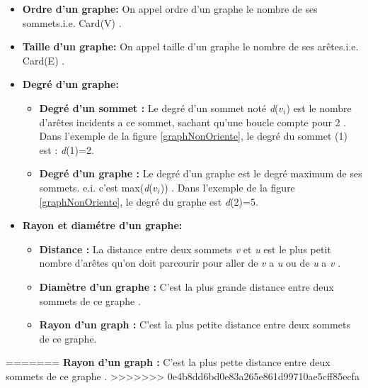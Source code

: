 		\begin{itemize}[label=$\circ$]
			
			\item \textbf{Ordre d'un graphe:} On appel ordre d’un 					graphe le nombre de ses sommets.i.e. Card(V) \citep{DUT}.
			
			\item  \textbf{Taille d'un graphe:} On appel taille d’un 				graphe le nombre de ses arêtes.i.e. Card(E) \citep{DUT}.
			
			\item  \textbf{Degré d'un graphe:}
			
			
			\begin{itemize}[label=$\bullet$]
				\item \textbf{Degré d'un sommet : } Le degré d’un sommet noté \textit{d}($\textit{v}_{i}$) est le nombre d'arêtes incidents a ce sommet, sachant qu’une boucle compte pour 2 \citep{muller} . Dans l'exemple de la figure \ref{graphNonOriente}, le degré du sommet (1) est : \textit{d}(1)=2.
				
				\item \textbf{Degré d'un graphe : }Le degré d’un graphe est 			le degré maximum de ses sommets. e.i. c’est 						max(\textit{d}($\textit{v}_{i}$)) \citep{muller}. Dans l’exemple de 				la figure \ref{graphNonOriente}, le degré du graphe est \textit{d}(2)=5.
			\end{itemize}
			
			\item \textbf{Rayon et diamétre d'un graphe:}
			\begin{itemize}[label=$\bullet$]
				\item \textbf{Distance : }La distance entre deux sommets 	\textit{v} et \textit{u} est le plus petit nombre d’arêtes qu’on doit parcourir pour aller de \textit{v} a \textit{u} ou de \textit{u} a \textit{v} \citep{muller}. 
				
				\item 	\textbf{Diamètre d’un graphe :} C’est la plus grande 	distance entre deux sommets de ce graphe \citep{muller}. 
				
				\item 	\textbf{Rayon d’un graph : }C’est la plus petite distance entre deux sommets de ce graphe. 
			\end{itemize}
		\end{itemize}
		
	
			
		
=======
			\textbf{Rayon d’un graph : }C’est la plus pette 					distance entre deux sommets de ce graphe \citep{parlebas1972centralite}. 
>>>>>>> 0e4b8dd6bd0e83a265e861d99710ae5cff85ecfa
		
	